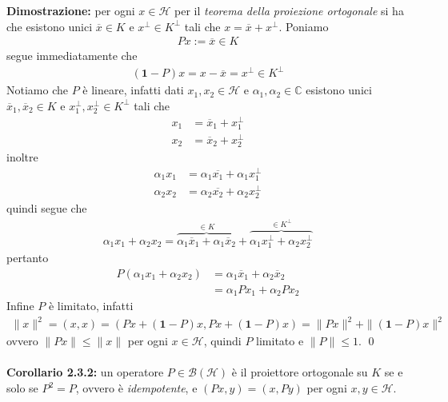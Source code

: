\documentclass{article}
\numberwithin{equation}{subsection}
\begin{document}
\textbf{Dimostrazione:} per ogni $x \in \mathcal{H}$ per il \textit{teorema della proiezione ortogonale} si ha che esistono unici $\overline{x} \in K$ e $x^\perp \in K^\perp$ tali che $x = \overline{x} + x^\perp$. Poniamo
\begin{align*}
    Px := \overline{x} \in K 
\end{align*}
segue immediatamente che 
\begin{align*}
    (\mathbf{1} - P)x = x - \overline{x} = x^\perp \in K^\perp 
\end{align*}
Notiamo che $P$ è lineare, infatti dati $x_1, x_2 \in \mathcal{H}$ e $\alpha_1, \alpha_2 \in \mathbb{C}$ esistono unici $\overline{x}_1, \overline{x}_2 \in K$ e $x^\perp_1, x^\perp_2 \in K^\perp$ tali che 
\begin{align*}
    x_1 &= \overline{x}_1 + x^\perp_1  \\
    x_2 &= \overline{x}_2 + x^\perp_2 
\end{align*}
inoltre
\begin{align*}
    \alpha_1x_1 &= \alpha_1\overline{x_1} + \alpha_1x^\perp_1  \\
    \alpha_2x_2 &= \alpha_2\overline{x_2} + \alpha_2x^\perp_2 
\end{align*}
quindi segue che 
\begin{align*}
    \alpha_1x_1 + \alpha_2x_2 = \overbrace{\alpha_1\overline{x}_1 + \alpha_1\overline{x}_2}^{\in K} + \overbrace{\alpha_1x^\perp_1 + \alpha_2x^\perp_2}^{\in K^\perp} 
\end{align*}
pertanto 
\begin{align*}
    P(\alpha_1x_1 + \alpha_2x_2) &= \alpha_1\overline{x}_1 + \alpha_2\overline{x}_2  \\
    &= \alpha_1Px_1 + \alpha_2Px_2 
\end{align*}
Infine $P$ è limitato, infatti 
\begin{align*}
    \|x\|^2 = (x, x) = (Px + (\mathbf{1} - P)x, Px + (\mathbf{1} - P)x) = \|Px\|^2 + \|(\mathbf{1} - P)x\|^2 
\end{align*}
ovvero $\|Px\| \leq \|x\|$ per ogni $x \in \mathcal{H}$, quindi $P$ limitato e $\|P\| \leq 1$. \qed \\ \\
\textbf{Corollario 2.3.2:} un operatore $P \in \mathcal{B}(\mathcal{H})$ è il proiettore ortogonale su $K$ se e solo se $P^2 = P$, ovvero è \textit{idempotente}, e $(Px, y) = (x, Py)$ per ogni $x, y \in \mathcal{H}$. \\
\end{document}
